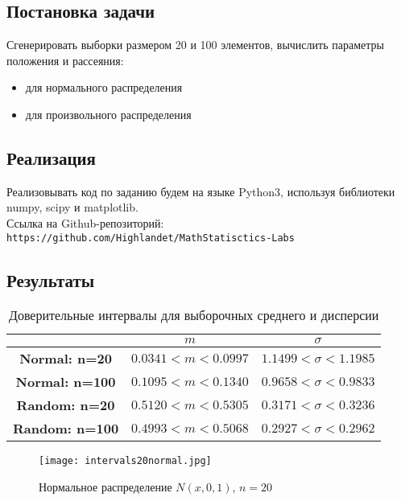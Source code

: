 \documentclass[14pt]{extarticle}
\begin{document}
\subsection{Постановка задачи}

Сгенерировать выборки размером 20 и 100 элементов, вычислить параметры положения и рассеяния:
\begin{itemize}
    \item для нормального распределения
    \item для произвольного распределения
\end{itemize}

\subsection{Реализация}
Реализовывать код по заданию будем на языке Python3, используя библиотеки numpy, scipy и matplotlib.\\
Ссылка на Github-репозиторий: \\
\texttt{https://github.com/Highlandet/MathStatisctics-Labs}

\subsection{Результаты}

\begin{table}[htbp]
    \centering
    \begin{tabular}{|c|c|c|}
        \toprule
         & \(m\) & \(\sigma\)\\
        \toprule
        \textbf{Normal: n=20} & \(0.0341 < m < 0.0997\) & \(1.1499 < \sigma < 1.1985\)\\
        \midrule
  	\textbf{Normal: n=100} & \(0.1095 < m < 0.1340\) & \(0.9658 < \sigma < 0.9833\)\\
        \toprule
        \textbf{Random: n=20} & \(0.5120 < m < 0.5305\) & \(0.3171 < \sigma < 0.3236\)\\
        \midrule
        \textbf{Random: n=100} & \(0.4993 < m < 0.5068\) & \(0.2927 < \sigma < 0.2962\)\\
        \toprule
    \end{tabular}
    \caption{Доверительные интервалы для выборочных среднего и дисперсии}
    \label{tab:mus_n_sigmas}
\end{table}

\begin{figure}[H]
    \centering
    \texttt{[image: intervals20normal.jpg]}
    \caption{Нормальное распределение \(N(x, 0, 1)\), \(n=20\)}
    \label{fig:enter-label}
\end{figure}
\end{document}
